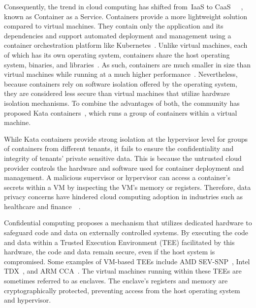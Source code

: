 Consequently, the trend in cloud computing has shifted from~\acrshort{IaaS} to CaaS~\cite*{Azure_container}~\cite*{Amazon_container}~\cite*{google_container}, known as Container as a Service. Containers provide a more lightweight solution compared to virtual machines. They contain only the application and its dependencies and support automated deployment and management using a 
container orchestration platform like Kubernetes~\cite*{k8s}. Unlike virtual machines, each of which has its own operating system, containers share the host operating system, binaries, and libraries~\cite*{container_vs_vm}. As such, containers are much smaller in size than virtual machines while running at a much higher performance~\cite*{Shirinbab2020PerformanceEO}. 
Nevertheless, because containers rely on software isolation offered by the operating system, they are considered less secure than virtual machines that utilize hardware isolation mechanisms. To combine the advantages of both, the community has proposed Kata containers~\cite*{Kata-Containers}, which 
runs a group of containers within a virtual machine.
 
While Kata containers provide strong isolation at the hypervisor level for groups of containers from different tenants, it fails to ensure the confidentiality and integrity of tenants' private sensitive data. This is because the untrusted cloud provider controls the hardware and software used for 
container deployment and management. A malicious supervisor or hypervisor can access a container's secrets within a VM by inspecting the VM's memory or registers. Therefore, data privacy concerns have hindered cloud computing adoption in industries such as healthcare and finance~\cite*{data_privacy}~\cite*{eu_data_Privacy}.
 
Confidential computing proposes a mechanism that utilizes dedicated hardware to safeguard code and data on externally controlled systems. By executing the code and data within a Trusted Execution Environment (TEE) facilitated by this hardware, the code and data remain secure, even if the host system is compromised. Some examples of VM-based \acrshort{TEE}s include 
AMD SEV-SNP~\cite*{SEV_SNP_white_book}, Intel TDX~\cite*{Intel_tdx_whitepaper}, and ARM CCA~\cite*{280904}. The virtual machines running within these \acrshort{TEE}s are sometimes referred to as enclaves. The enclave's registers and memory are 
cryptographically protected, preventing access from the host operating system and hypervisor.
 
 
 
